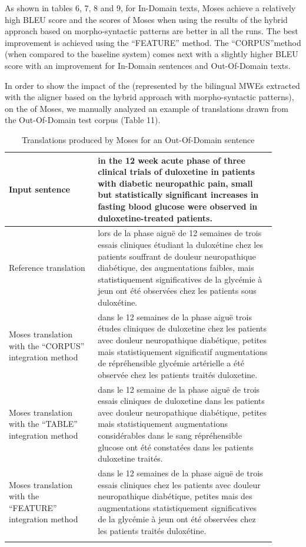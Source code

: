 \documentclass[output=paper,modfonts,nonflat]{langsci/langscibook}
\begin{document}
As shown in tables 6, 7, 8 and 9, for In-Domain texts, Moses achieve a relatively high BLEU score and the scores of Moses when using the results of the hybrid approach based on morpho-syntactic patterns are better in all the runs. The best improvement is achieved using the ``FEATURE'' method. %
The ``CORPUS''method (when compared to the baseline system) comes next with a slightly higher BLEU score with an improvement %
for In-Domain sentences and %
Out-Of-Domain texts.

In order to show the impact of the  (represented by the bilingual MWEs extracted with the aligner based on the hybrid approach with morpho-syntactic patterns), on the  of Moses, we manually analyzed an example of translations drawn from the Out-Of-Domain test corpus (Table 11).

\begin{table}
\caption{Translations produced by Moses for an Out-Of-Domain sentence}
\label{sem:tab:SMT_ex2}
\small
\centering
 \begin{tabular}{p{0.3\linewidth}p{0.6\linewidth}} 
  \lsptoprule
Input sentence & in the 12 week acute phase of three clinical trials of duloxetine in patients with diabetic neuropathic pain, small but statistically significant increases in fasting blood glucose were observed in duloxetine-treated patients. \\
  \midrule
Reference translation & lors de la phase aiguë de 12 semaines de trois essais cliniques étudiant la duloxétine chez les patients souffrant de douleur neuropathique diabétique, des augmentations faibles, mais statistiquement significatives de la glycémie à jeun ont été observées chez les patients sous duloxétine. \\
  \midrule
Moses translation with the ``CORPUS'' integration method & dans le 12 semaines de la phase aiguë trois études cliniques de duloxetine chez les patients avec douleur neuropathique diabétique, petites mais statistiquement significatif augmentations de répréhensible glycémie artérielle a été observée chez les patients traités duloxetine.\\
  \midrule
Moses translation with the ``TABLE'' integration method & dans le 12 semaine de la phase aiguë de trois essais cliniques de duloxetine dans les patients avec douleur neuropathique diabétique, petites mais statistiquement augmentations considérables dans le sang répréhensible glucose ont été constatées dans les patients duloxetine traités.\\
  \midrule
Moses translation with the ``FEATURE'' integration method & dans le 12 semaines de la phase aiguë de trois essais cliniques chez les patients avec douleur neuropathique diabétique, petites mais des augmentations statistiquement significatives de la glycémie à jeun ont été observées chez les patients traités duloxétine.\\
  \lspbottomrule
 \end{tabular}
\end{table}
\end{document}
